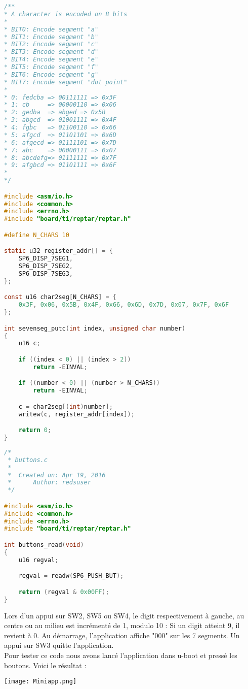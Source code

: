 \begin{lstlisting}[language=C,caption=7segs]
/**
* A character is encoded on 8 bits
*
* BIT0: Encode segment "a"
* BIT1: Encode segment "b"
* BIT2: Encode segment "c"
* BIT3: Encode segment "d"
* BIT4: Encode segment "e"
* BIT5: Encode segment "f"
* BIT6: Encode segment "g"
* BIT7: Encode segment "dot point"
*
* 0: fedcba => 00111111 => 0x3F
* 1: cb     => 00000110 => 0x06
* 2: gedba  => abged => 0x5B
* 3: abgcd  => 01001111 => 0x4F
* 4: fgbc   => 01100110 => 0x66
* 5: afgcd  => 01101101 => 0x6D
* 6: afgecd => 01111101 => 0x7D
* 7: abc    => 00000111 => 0x07
* 8: abcdefg=> 01111111 => 0x7F
* 9: afgbcd => 01101111 => 0x6F
*
*/

#include <asm/io.h>
#include <common.h>
#include <errno.h>
#include "board/ti/reptar/reptar.h"

#define N_CHARS 10

static u32 register_addr[] = {
	SP6_DISP_7SEG1,
	SP6_DISP_7SEG2,
	SP6_DISP_7SEG3,
};

const u16 char2seg[N_CHARS] = {
	0x3F, 0x06, 0x5B, 0x4F, 0x66, 0x6D, 0x7D, 0x07, 0x7F, 0x6F
};

int sevenseg_putc(int index, unsigned char number)
{
	u16 c;

	if ((index < 0) || (index > 2))
		return -EINVAL;

	if ((number < 0) || (number > N_CHARS))
		return -EINVAL;

	c = char2seg[(int)number];
	writew(c, register_addr[index]);

	return 0;
}
\end{lstlisting}

\begin{lstlisting}[language=C,caption=boutons]
/*
 * buttons.c
 *
 *  Created on: Apr 19, 2016
 *      Author: redsuser
 */

#include <asm/io.h>
#include <common.h>
#include <errno.h>
#include "board/ti/reptar/reptar.h"

int buttons_read(void)
{
	u16 regval;

	regval = readw(SP6_PUSH_BUT);

	return (regval & 0x00FF);
}
\end{lstlisting}

Lors d’un appui sur SW2, SW5 ou SW4, le digit respectivement à gauche, au centre ou au milieu est incrémenté de 1, modulo 10 : Si un digit atteint 9, il revient à 0. Au démarrage, l'application affiche "000" sur les 7 segments. Un appui sur SW3 quitte l'application.\\

Pour tester ce code nous avons lancé l'application dans u-boot et pressé les boutons. Voici le résultat :

\begin{center} 
\hspace{12.45cm}
\texttt{[image: Miniapp.png]}
\end{center}
\vspace{1cm} 